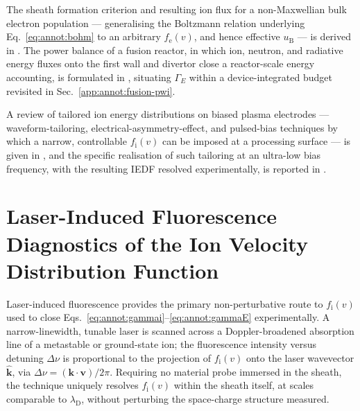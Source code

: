 The sheath formation criterion and resulting ion flux for a non-Maxwellian bulk electron population --- generalising the Boltzmann relation underlying Eq.~\eqref{eq:annot:bohm} to an arbitrary $f_{\mathrm{e}}(v)$, and hence effective $u_{\mathrm{B}}$ --- is derived in \cite{ref0090}. The power balance of a fusion reactor, in which ion, neutron, and radiative energy fluxes onto the first wall and divertor close a reactor-scale energy accounting, is formulated in \cite{ref0093}, situating $\Gamma_{E}$ within a device-integrated budget revisited in Sec.~\ref{app:annot:fusion-pwi}.

A review of tailored ion energy distributions on biased plasma electrodes --- waveform-tailoring, electrical-asymmetry-effect, and pulsed-bias techniques by which a narrow, controllable $f_{\mathrm{i}}(v)$ can be imposed at a processing surface --- is given in \cite{ref0105}, and the specific realisation of such tailoring at an ultra-low bias frequency, with the resulting IEDF resolved experimentally, is reported in \cite{ref0106}.

\section{Laser-Induced Fluorescence Diagnostics of the Ion Velocity Distribution Function}
\label{app:annot:lif-ivdf}

Laser-induced fluorescence provides the primary non-perturbative route to $f_{\mathrm{i}}(v)$ used to close Eqs.~\eqref{eq:annot:gammai}--\eqref{eq:annot:gammaE} experimentally. A narrow-linewidth, tunable laser is scanned across a Doppler-broadened absorption line of a metastable or ground-state ion; the fluorescence intensity versus detuning $\Delta\nu$ is proportional to the projection of $f_{\mathrm{i}}(v)$ onto the laser wavevector $\hat{\mathbf{k}}$, via $\Delta\nu = (\mathbf{k}\!\cdot\!\mathbf{v})/2\pi$. Requiring no material probe immersed in the sheath, the technique uniquely resolves $f_{\mathrm{i}}(v)$ within the sheath itself, at scales comparable to $\lambda_{\mathrm{D}}$, without perturbing the space-charge structure measured.

